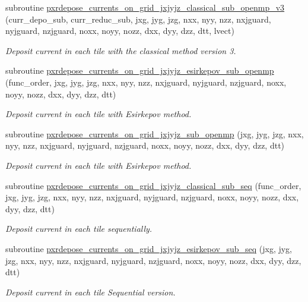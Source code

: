 \begin{DoxyCompactItemize}
subroutine \hyperlink{current__deposition_8_f90_a05b540593f69d201b9ac6e74b0fea593}{pxrdepose\+\_\+currents\+\_\+on\+\_\+grid\+\_\+jxjyjz\+\_\+classical\+\_\+sub\+\_\+openmp\+\_\+v3} (curr\+\_\+depo\+\_\+sub, curr\+\_\+reduc\+\_\+sub, jxg, jyg, jzg, nxx, nyy, nzz, nxjguard, nyjguard, nzjguard, noxx, noyy, nozz, dxx, dyy, dzz, dtt, lvect)
\begin{DoxyCompactList}\small\item\em Deposit current in each tile with the classical method version 3. \end{DoxyCompactList}\item 
subroutine \hyperlink{current__deposition_8_f90_ae617423f1f21cbacb686a291c6b0ad7b}{pxrdepose\+\_\+currents\+\_\+on\+\_\+grid\+\_\+jxjyjz\+\_\+esirkepov\+\_\+sub\+\_\+openmp} (func\+\_\+order, jxg, jyg, jzg, nxx, nyy, nzz, nxjguard, nyjguard, nzjguard, noxx, noyy, nozz, dxx, dyy, dzz, dtt)
\begin{DoxyCompactList}\small\item\em Deposit current in each tile with Esirkepov method. \end{DoxyCompactList}\item 
subroutine \hyperlink{current__deposition_8_f90_a7c88c5f1acf180c78f31dfdeb4b80516}{pxrdepose\+\_\+currents\+\_\+on\+\_\+grid\+\_\+jxjyjz\+\_\+sub\+\_\+openmp} (jxg, jyg, jzg, nxx, nyy, nzz, nxjguard, nyjguard, nzjguard, noxx, noyy, nozz, dxx, dyy, dzz, dtt)
\begin{DoxyCompactList}\small\item\em Deposit current in each tile with Esirkepov method. \end{DoxyCompactList}\item 
subroutine \hyperlink{current__deposition_8_f90_a9cba9f74ee775de5a5f60eb97ff619a4}{pxrdepose\+\_\+currents\+\_\+on\+\_\+grid\+\_\+jxjyjz\+\_\+classical\+\_\+sub\+\_\+seq} (func\+\_\+order, jxg, jyg, jzg, nxx, nyy, nzz, nxjguard, nyjguard, nzjguard, noxx, noyy, nozz, dxx, dyy, dzz, dtt)
\begin{DoxyCompactList}\small\item\em Deposit current in each tile sequentially. \end{DoxyCompactList}\item 
subroutine \hyperlink{current__deposition_8_f90_ac4575c491c1cfe9d048c6cb1b6d5fbdb}{pxrdepose\+\_\+currents\+\_\+on\+\_\+grid\+\_\+jxjyjz\+\_\+esirkepov\+\_\+sub\+\_\+seq} (jxg, jyg, jzg, nxx, nyy, nzz, nxjguard, nyjguard, nzjguard, noxx, noyy, nozz, dxx, dyy, dzz, dtt)
\begin{DoxyCompactList}\small\item\em Deposit current in each tile Sequential version. \end{DoxyCompactList}\item 

\end{DoxyCompactItemize}
